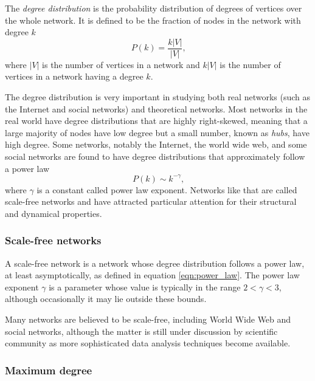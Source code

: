       The \emph{degree distribution} is the probability distribution of degrees of vertices over the whole network. It is defined to be the fraction of nodes in the network with degree $k$
      \begin{equation}
        P(k) = \frac{k|V|}{|V|} \mbox{,}
      \end{equation}
      where $|V|$ is the number of vertices in a network and $k|V|$ is the number of vertices in a network having a degree $k$.

      The degree distribution is very important in studying both real networks (such as the Internet and social networks) and theoretical networks. Most networks in the real world have degree distributions that are highly right-skewed, meaning that a large majority of nodes have low degree but a small number, known as \emph{hubs}, have high degree. Some networks, notably the Internet, the world wide web, and some social networks are found to have degree distributions that approximately follow a power law
      \begin{equation}
        P(k) \sim k^{−\gamma} \mbox{,} \label{eqn:power_law}
      \end{equation}
      where $\gamma$ is a constant called power law exponent. Networks like that are called scale-free networks and have attracted particular attention for their structural and dynamical properties.
      
      \subsubsection{Scale-free networks}
  
        A scale-free network is a network whose degree distribution follows a power law, at least asymptotically, as defined in equation \ref{eqn:power_law}.
        The power law exponent $\gamma$ is a parameter whose value is typically in the range $2 < \gamma < 3$, although occasionally it may lie outside these bounds\cite{OnnelaSaramakiBarabasi2007,ChoromanskiMatuszakMiekisz2013}.

        Many networks are believed to be scale-free, including World Wide Web and social networks, although the matter is still under discussion by scientific community as more sophisticated data analysis techniques become available\cite{ClausetShaliziNewman2007}.
        
      \subsubsection{Maximum degree}
      
